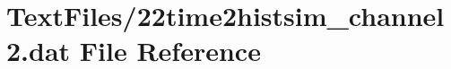 \hypertarget{22time2histsim__channel2_8dat}{}\section{Text\+Files/22time2histsim\+\_\+channel2.dat File Reference}
\label{22time2histsim__channel2_8dat}
